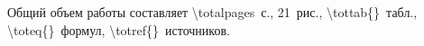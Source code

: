 Общий объем работы составляет \num{\totalpages}~с., \num{21}~рис., \num{\tottab{}}~табл., \num{\toteq{}}~формул, \num{\totref{}}~источников.


%
%
%
%
%
